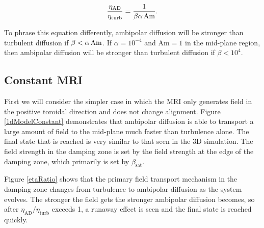 \begin{equation}
\frac{\eta_{\text{AD}}}{\eta_{\text{turb}}} = \frac{1}{\beta \alpha \hspace{0.5mm} \text{Am}}.
\label{eqEtaRatio}
\end{equation}

\noindent  To phrase this equation differently, ambipolar diffusion will be stronger than turbulent diffusion if $\beta < \alpha \hspace{0.5mm} \text{Am}$.  If $\alpha=10^{-4}$ and $\text{Am}=1$ in the mid-plane region, then ambipolar diffusion will be stronger than turbulent diffusion if $\beta<10^4$.


\subsection{Constant MRI}
First we will consider the simpler case in which the MRI only generates field in the positive toroidal direction and does not change alignment.  Figure \ref{1dModelConstant} demonstrates that ambipolar diffusion is able to transport a large amount of field to the mid-plane much faster than turbulence alone.  The final state that is reached is very similar to that seen in the 3D simulation.  The field strength in the damping zone is set by the field strength at the edge of the damping zone, which primarily is set by $\beta_\text{sat}$.  

Figure \ref{etaRatio} shows that the primary field transport mechanism in the damping zone changes from turbulence to ambipolar diffusion as the system evolves.  The stronger the field gets the stronger ambipolar diffusion becomes, so after $\eta_\text{AD}/\eta_\text{turb}$ exceeds 1, a runaway effect is seen and the final state is reached quickly.  

